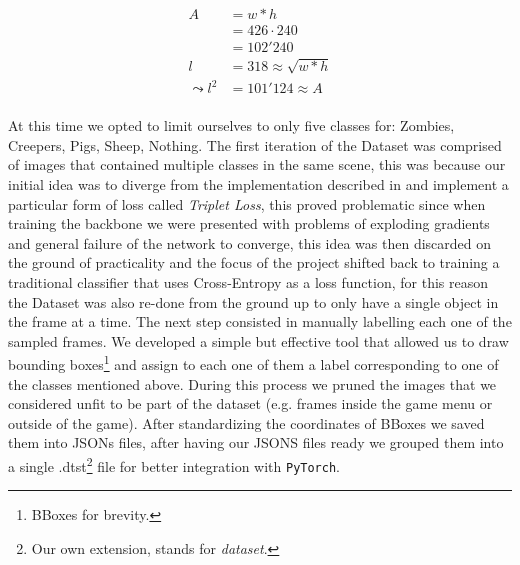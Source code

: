 \documentclass[10pt,journal,cspaper,compsoc]{IEEEtran}
\newcommand{\code}[1]{\texttt{#1}}
\begin{document}
    \begin{equation}\label{eq:area}
        \begin{aligned}
            A &= w * h \\
            &= 426 \cdot 240\\ 
            &= 102'240\\
            l &= 318 \approx \sqrt{w * h}\\
            \leadsto l^2 &= 101'124 \approx A\\
        \end{aligned}
    \end{equation} 
    
    At this time we opted to limit ourselves to only five classes for: Zombies, Creepers, Pigs, Sheep, Nothing.
    The first iteration of the Dataset was comprised of images that contained multiple classes in the same scene, this was because our initial idea was to diverge from the implementation described in \cite{arxiv:FasterRCNN} and implement a particular form of loss called \emph{Triplet Loss}\cite{Chechik:Triplet}, this proved problematic since when training the backbone we were presented with problems of exploding gradients and general failure of the network to converge, this idea was then discarded on the ground of practicality and the focus of the 
    project shifted back to training a traditional classifier that uses Cross-Entropy as a loss function, for this reason the Dataset was also re-done from the ground up to only have a single object in the frame at a time.
    The next step consisted in manually labelling each one of the sampled frames. We developed a simple but effective tool that allowed us to draw bounding boxes\footnote{BBoxes for brevity.} and assign to each one of them a label corresponding to one of the classes mentioned above. During this process we pruned the images that we considered
    unfit to be part of the dataset (e.g. frames inside the game menu or outside of the game). After standardizing the coordinates of BBoxes we saved them into JSONs files, after having our JSONS files ready we grouped them into a single .dtst\footnote{Our own extension, stands for \emph{dataset}.} file for better integration with \code{PyTorch}.
    
\end{document}
